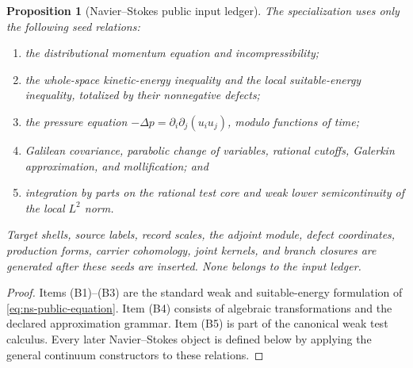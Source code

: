 \documentclass[11pt]{article}
\numberwithin{section}{part}
\theoremstyle{plain}
\newtheorem{proposition}[proposition]{Proposition}
\theoremstyle{definition}
\theoremstyle{remark}
\begin{document}
\begin{proposition}[Navier--Stokes public input ledger]
\label{prop:ns-public-input-ledger}
The specialization uses only the following seed relations:
\begin{enumerate}[label=\textup{(B\arabic*)}]
\item the distributional momentum equation and incompressibility;
\item the whole-space kinetic-energy inequality and the local suitable-energy
inequality, totalized by their nonnegative defects;
\item the pressure equation
\(-\Delta p=\partial_i\partial_j(u_i u_j)\), modulo functions of time;
\item Galilean covariance, parabolic change of variables, rational cutoffs,
Galerkin approximation, and mollification; and
\item integration by parts on the rational test core and weak lower
semicontinuity of the local \(L^2\) norm.
\end{enumerate}
Target shells, source labels, record scales, the adjoint module, defect
coordinates, production forms, carrier cohomology, joint kernels, and branch
closures are generated after these seeds are inserted.  None belongs to the
input ledger.
\end{proposition}

\begin{proof}
Items \textup{(B1)}--\textup{(B3)} are the standard weak and suitable-energy
formulation of \eqref{eq:ns-public-equation}.  Item \textup{(B4)} consists of
algebraic transformations and the declared approximation grammar.  Item
\textup{(B5)} is part of the canonical weak test calculus.  Every later
Navier--Stokes object is defined below by applying the general continuum
constructors to these relations.
\end{proof}
\end{document}
